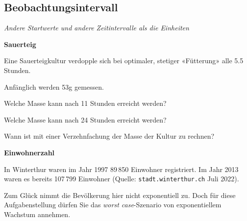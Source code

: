 
\subsection{Beobachtungsintervall}
\textit{Andere Startwerte und andere Zeitintervalle als die Einheiten}



\bbwActAufgabenNr{} \textbf{Sauerteig}

Eine Sauerteigkultur verdopple sich bei optimaler, stetiger «Fütterung» alle 5.5 Stunden.

Anfänglich werden 53g gemessen.

\begin{bbwAufgabenBlock}

\item Welche Masse kann nach 11 Stunden erreicht werden?

\item Welche Masse kann nach 24 Stunden erreicht werden?

\item Wann ist mit einer Verzehnfachung der Masse der Kultur zu rechnen?


\end{bbwAufgabenBlock}
\platzFuerBerechnungenBisEndeSeite{}



\bbwActAufgabenNr{} \textbf{Einwohnerzahl}

In Winterthur waren im Jahr 1997 89\,850 Einwohner registriert. Im Jahr 2013 waren es
bereits 107\,799 Einwohner (Quelle: \texttt{stadt.winterthur.ch} Juli 2022).

Zum Glück nimmt die Bevölkerung hier nicht exponentiell zu. Doch für
diese Aufgabenstellung dürfen Sie das \textit{worst case}-Szenario von
exponentiellem Wachstum annehmen.

